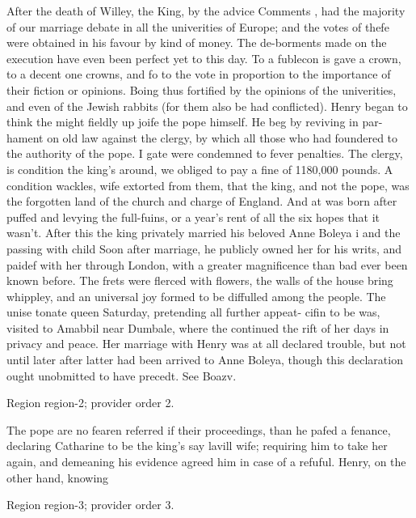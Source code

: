 \documentclass[11pt]{article}
\begin{document}
After the death of Willey, the King, by the advice Comments , had the majority of our marriage debate in all the univerities of Europe; and the votes of thefe were obtained in his favour by kind of money. The de-borments made on the execution have even been perfect yet to this day. To a fublecon is gave a crown, to a decent one crowns, and fo to the vote in proportion to the importance of their fiction or opinions. Boing thus fortified by the opinions of the univerities, and even of the Jewish rabbits (for them also be had conflicted). Henry began to think the might fieldly up joife the pope himself. He beg by reviving in par-hament on old law against the clergy, by which all those who had foundered to the authority of the pope. I gate were condemned to fever penalties. The clergy, is condition the king’s around, we obliged to pay a fine of 1180,000 pounds. A condition wackles, wife extorted from them, that the king, and not the pope, was the forgotten land of the church and charge of England. And at was born after puffed and levying the full-fuins, or a year's rent of all the six hopes that it wasn't. After this the king privately married his beloved Anne Boleya i and the passing with child Soon after marriage, he publicly owned her for his writs, and paidef with her through London, with a greater magnificence than bad ever been known before. The frets were flerced with flowers, the walls of the house bring whippley, and an universal joy formed to be diffulled among the people. The unise tonate queen Saturday, pretending all further appeat- cifin to be was, visited to Amabbil near Dumbale, where the continued the rift of her days in privacy and peace. Her marriage with Henry was at all declared trouble, but not until later after latter had been arrived to Anne Boleya, though this declaration ought unobmitted to have precedt. See Boazv.
\par

{\scriptsize\color{gray} Region region-2; provider order 2.\par}
\medskip

The pope are no fearen referred if their proceedings, than he pafed a fenance, declaring Catharine to be the king’s say lavill wife; requiring him to take her again, and demeaning his evidence agreed him in case of a refuful. Henry, on the other hand, knowing
\par

{\scriptsize\color{gray} Region region-3; provider order 3.\par}
\medskip
\end{document}
